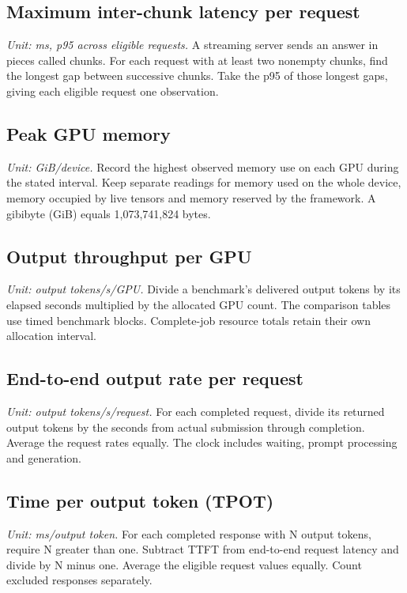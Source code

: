 \documentclass[conference,onecolumn]{IEEEtran}
\begin{document}
\subsection{Maximum inter-chunk latency per request}

\textit{Unit: ms, p95 across eligible requests.} A streaming server sends an answer in pieces called chunks. For each request with at least two nonempty chunks, find the longest gap between successive chunks. Take the p95 of those longest gaps, giving each eligible request one observation.

\subsection{Peak GPU memory}

\textit{Unit: GiB/device.} Record the highest observed memory use on each GPU during the stated interval. Keep separate readings for memory used on the whole device, memory occupied by live tensors and memory reserved by the framework. A gibibyte (GiB) equals 1,073,741,824 bytes.

\subsection{Output throughput per GPU}

\textit{Unit: output tokens/s/GPU.} Divide a benchmark's delivered output tokens by its elapsed seconds multiplied by the allocated GPU count. The comparison tables use timed benchmark blocks. Complete-job resource totals retain their own allocation interval.

\subsection{End-to-end output rate per request}

\textit{Unit: output tokens/s/request.} For each completed request, divide its returned output tokens by the seconds from actual submission through completion. Average the request rates equally. The clock includes waiting, prompt processing and generation.

\subsection{Time per output token (TPOT)}

\textit{Unit: ms/output token.} For each completed response with N output tokens, require N greater than one. Subtract TTFT from end-to-end request latency and divide by N minus one. Average the eligible request values equally. Count excluded responses separately.
\end{document}
